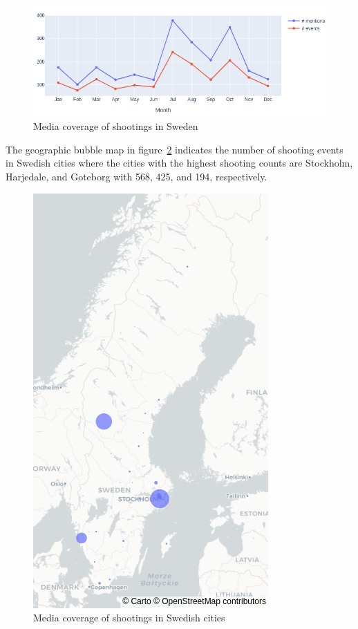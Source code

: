 \documentclass[a4, 11pt]{article}
\begin{document}
\begin{figure}[htbp]
    \centering
    \includegraphics[scale=0.60,angle=0]{Images/sweden_shootings.png}%
    \caption{Media coverage of shootings in Sweden} 
    \label{fig:shootings_time_series}
\end{figure}

 The geographic bubble map in figure~\ref{fig:shootings_geo} indicates the
 number of shooting events in Swedish cities where the cities with the highest
 shooting counts are Stockholm, Harjedale, and Goteborg with 568, 425, and 194, respectively.

\begin{figure}[htbp]
    \centering
    \includegraphics[scale=0.65,angle=90]{Images/shootings_geo.png}%
    \caption{Media coverage of shootings in Swedish cities} 
    \label{fig:shootings_geo}
\end{figure}
\end{document}
